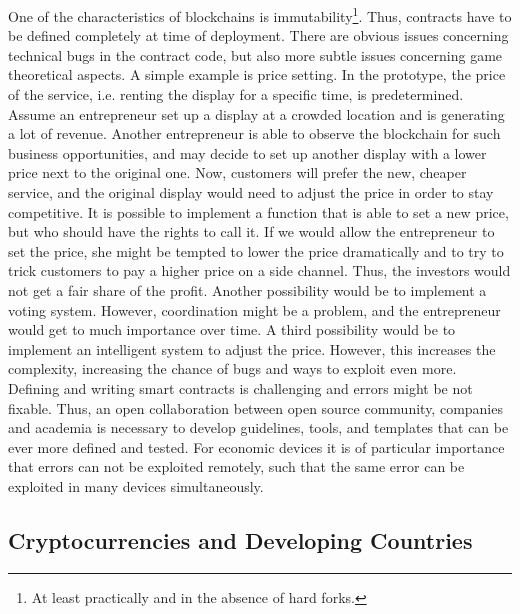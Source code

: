 One of the characteristics of blockchains is immutability\footnote{At least practically and in the absence of hard forks.}. Thus, contracts have to be defined completely at time of deployment. There are obvious issues concerning technical bugs in the contract code, but also more subtle issues concerning game theoretical aspects. A simple example is price setting. In the prototype, the price of the service, i.e. renting the display for a specific time, is predetermined. Assume an entrepreneur set up a display at a crowded location and is generating a lot of revenue. Another entrepreneur is able to observe the blockchain for such business opportunities, and may decide to set up another display with a lower price next to the original one. Now, customers will prefer the new, cheaper service, and the original display would need to adjust the price in order to stay competitive. It is possible to implement a function that is able to set a new price, but who should have the rights to call it. If we would allow the entrepreneur to set the price, she might be tempted to lower the price dramatically and to try to trick customers to pay a higher price on a side channel. Thus, the investors would not get a fair share of the profit. Another possibility would be to implement a voting system. However, coordination might be a problem, and the entrepreneur would get to much importance over time. A third possibility would be to implement an intelligent system to adjust the price. However, this increases the complexity, increasing the chance of bugs and ways to exploit even more. 
Defining and writing smart contracts is challenging and errors might be not fixable. Thus, an open collaboration between open source community, companies and academia is necessary to develop guidelines, tools, and templates that can be ever more defined and tested. For economic devices it is of particular importance that errors can not be exploited remotely, such that the same error can be exploited in many devices simultaneously. 

\subsection{Cryptocurrencies and Developing Countries}

